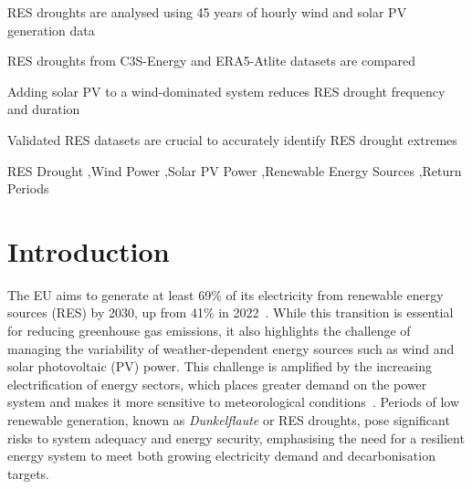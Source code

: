 \documentclass[preprint, 12pt]{elsarticle}
\begin{document}
\begin{frontmatter}
\begin{highlights}
\item RES droughts are analysed using 45 years of hourly wind and solar PV generation data

\item RES droughts from C3S-Energy and ERA5-Atlite datasets are compared

\item Adding solar PV to a wind-dominated system reduces RES drought frequency and duration

\item Validated RES datasets are crucial to accurately identify RES drought extremes

\end{highlights}

\begin{keyword}
RES Drought \sep Wind Power \sep Solar PV Power \sep Renewable Energy Sources \sep Return Periods

\end{keyword}

\end{frontmatter}

\linenumbers

\section{Introduction}
\label{sec:intro}

The EU aims to generate at least 69\% of its electricity from renewable energy sources (RES) by 2030, up from 41\% in 2022~\citep{eurostat2023share}. While this transition is essential for reducing greenhouse gas emissions, it also highlights the challenge of managing the variability of weather-dependent energy sources such as wind and solar photovoltaic (PV) power. This challenge is amplified by the increasing electrification of energy sectors, which places greater demand on the power system and makes it more sensitive to meteorological conditions~\citep{staffell2018demand}. Periods of low renewable generation, known as \textit{Dunkelflaute} or RES droughts, pose significant risks to system adequacy and energy security, emphasising the need for a resilient energy system to meet both growing electricity demand and decarbonisation targets.
\end{document}
